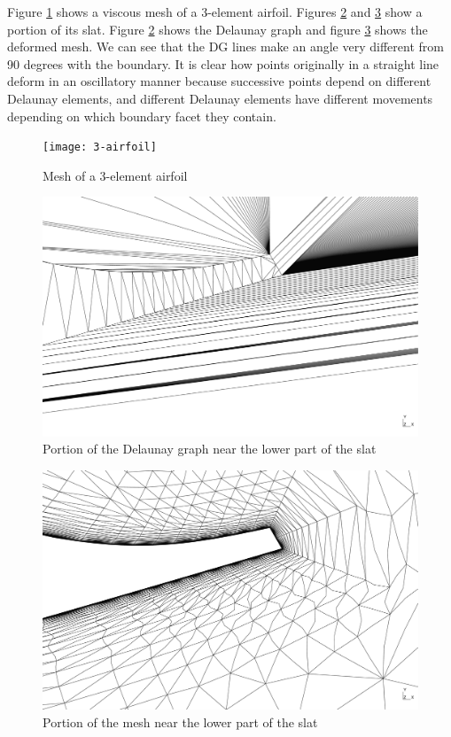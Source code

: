 \documentclass{article}
\begin{document}
Figure \ref{wmesh} shows a viscous mesh of a 3-element airfoil. Figures \ref{dg} and \ref{mesh} show a portion of its slat. Figure \ref{dg} shows the Delaunay graph and figure \ref{mesh} shows the deformed mesh. We can see that the DG lines make an angle very different from 90 degrees with the boundary. It is clear how points originally in a straight line deform in an oscillatory manner because successive points depend on different Delaunay elements, and different Delaunay elements have different movements depending on which boundary facet they contain.
\FloatBarrier
\begin{figure}[H!]
	\centering
	\texttt{[image: 3-airfoil]}
	\caption{Mesh of a 3-element airfoil}
	\label{wmesh}
\end{figure}
\clearpage
\begin{figure}[p!]
	\centering
	\includegraphics[scale=0.25]{dg-3airfoil-zoomed}
	\caption{Portion of the Delaunay graph near the lower part of the slat}
	\label{dg}
\end{figure}
\begin{figure}[p!]
	\centering
	\includegraphics[scale=0.25]{mesh-3airfoil-zoomed}
	\caption{Portion of the mesh near the lower part of the slat}
	\label{mesh}
\end{figure}
\end{document}
